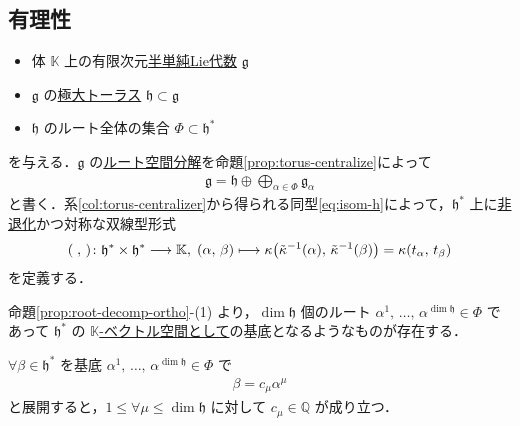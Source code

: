 \documentclass[rep_main]{subfiles}
\begin{document}
\subsection{有理性}

\begin{itemize}
	\item 体 $\mathbb{K}$ 上の有限次元\hyperref[def:semisimple-LieAlg]{半単純Lie代数} $\mathfrak{g}$
	\item $\mathfrak{g}$ の\hyperref[def:toral-subLieAlg]{極大トーラス} $\mathfrak{h} \subset \mathfrak{g}$
	\item $\mathfrak{h}$ のルート全体の集合 $\Phi \subset \mathfrak{h}^*$ 
\end{itemize}
を与える．$\mathfrak{g}$ の\hyperref[eq:root-decomp]{ルート空間分解}を命題\ref{prop:torus-centralize}によって
\begin{align}
	\mathfrak{g} = \mathfrak{h} \oplus \bigoplus_{\alpha \in \Phi} \mathfrak{g}_\alpha
\end{align}
と書く．系\ref{col:torus-centralizer}から得られる同型\eqref{eq:isom-h}によって，$\mathfrak{h}^*$ 上に\hyperref[def:radical-bilinear]{非退化}かつ対称な双線型形式
\begin{align}
	(\; ,\, ) \colon \mathfrak{h}^* \times \mathfrak{h}^* \longrightarrow \mathbb{K},\; (\alpha,\, \beta) \longmapsto \kappa\bigl(\tilde{\kappa}^{-1}(\alpha),\, \tilde{\kappa}^{-1}(\beta)\bigr) = \kappa(t_\alpha,\, t_\beta)
\end{align}
を定義する．

命題\ref{prop:root-decomp-ortho}-(1) より，$\dim \mathfrak{h}$ 個のルート $\alpha^1,\, \dots,\, \alpha^{\dim \mathfrak{h}} \in \Phi$ であって $\mathfrak{h}^*$ の \underline{$\mathbb{K}$-ベクトル空間として}の基底となるようなものが存在する．

\begin{mylem}[label=lem:root-Q]{}
	$\forall \beta \in \mathfrak{h}^*$ を基底 $\alpha^1,\, \dots,\, \alpha^{\dim \mathfrak{h}} \in \Phi$ で
	\begin{align}
		\beta = c_\mu \alpha^\mu
	\end{align}
	と展開すると，$1 \le \forall \mu \le \dim \mathfrak{h}$ に対して $c_\mu \in \mathbb{Q}$ が成り立つ．
\end{mylem}
\end{document}
